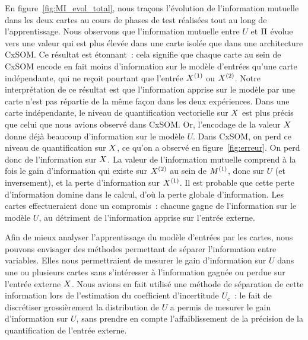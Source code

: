 \documentclass[../main]{subfiles}
\begin{document}
En figure~\ref{fig:MI_evol_total}, nous traçons l'évolution de l'information mutuelle dans les deux cartes au cours de phases de test réalisées tout au long de l'apprentissage.
Nous observons que l'information mutuelle entre $U$ et $\Pi$ évolue vers une valeur qui est plus élevée dans une carte isolée que dans une architecture CxSOM.
Ce résultat est étonnant~: cela signifie que chaque carte au sein de CxSOM encode en fait moins d'information sur le modèle d'entrées qu'une carte indépendante, qui ne reçoit pourtant que l'entrée $X^{({1})}$ ou $X^{({2})}$.
Notre interprétation de ce résultat est que l'information apprise sur le modèle par une carte n'est pas répartie de la même façon dans les deux expériences.
Dans une carte indépendante, le niveau de quantification vectorielle sur $X$ est plus précis que celui que nous avions observé dans CxSOM.
Or, l'encodage de la valeur $X$ donne déjà beaucoup d'information sur le modèle $U$.
Dans CxSOM, on perd ce niveau de quantification sur $X$, ce qu'on a observé en figure~\ref{fig:erreur}. On perd donc de l'information sur $X$.
La valeur de l'information mutuelle comprend à la fois le gain d'information qui existe sur $X^{({2})}$ au sein de $M^{({1})}$, donc sur $U$ (et inversement), et la perte d'information sur $X^{({1})}$. 
Il est probable que cette perte d'information domine dans le calcul, d'où la perte globale d'information.
Les cartes effectueraient donc un compromis~: chacune gagne de l'information sur le modèle $U$, au détriment de l'information apprise sur l'entrée externe.

Afin de mieux analyser l'apprentissage du modèle d'entrées par les cartes, nous pouvons envisager des méthodes permettant de séparer l'information entre variables. Elles nous permettraient de mesurer le gain d'information sur $U$ dans une ou plusieurs cartes sans s'intéresser à l'information gagnée ou perdue sur l'entrée externe $X$.
Nous avions en fait utilisé une méthode de séparation de cette information lors de l'estimation du coefficient d'incertitude $U_c$~: le fait de discrétiser grossièrement la distribution de $U$ a permis de mesurer le gain d'information sur $U$, sans prendre en compte l'affaiblissement de la précision de la quantification de l'entrée externe.
\end{document}
